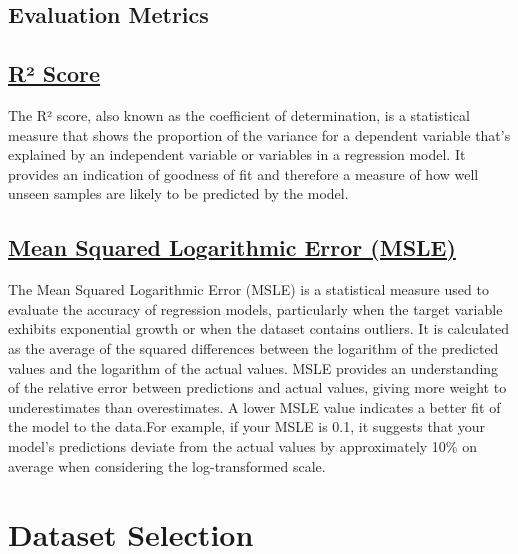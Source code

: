 \documentclass[conference]{IEEEtran}
\begin{document}
    \subsection*{Evaluation Metrics}
    
    \subsection*{\href{https://en.wikipedia.org/wiki/Coefficient_of_determination}{R² Score}}
        The R² score, also known as the coefficient of determination, is a statistical measure that shows the proportion of the variance for a dependent variable that's explained by an independent variable or variables in a regression model. It provides an indication of goodness of fit and therefore a measure of how well unseen samples are likely to be predicted by the model.
    
    \subsection*{\href{https://scikit-learn.org/stable/modules/generated/sklearn.metrics.mean_squared_log_error.html}{Mean Squared Logarithmic Error (MSLE)}}
        The Mean Squared Logarithmic Error (MSLE) is a statistical measure used to evaluate the accuracy of regression models, particularly when the target variable exhibits exponential growth or when the dataset contains outliers. It is calculated as the average of the squared differences between the logarithm of the predicted values and the logarithm of the actual values. MSLE provides an understanding of the relative error between predictions and actual values, giving more weight to underestimates than overestimates. A lower MSLE value indicates a better fit of the model to the data.For example, if your MSLE is 0.1, it suggests that your model's predictions deviate from the actual values by approximately 10\% on average when considering the log-transformed scale.

\section{Dataset Selection}
\end{document}
